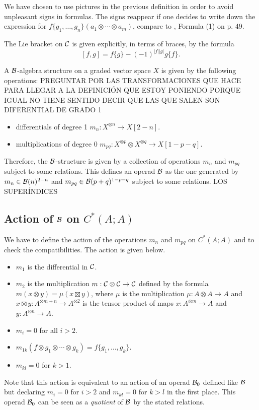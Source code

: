 \documentclass[TFM.tex]{subfiles}
\begin{document}
\begin{remark}
We have chosen to use pictures in the previous definition in order to avoid unpleasant
signs in formulas. The signs reappear if one decides to write down the expression for
$f\{g_1,\dots, g_n\}(a_1\otimes \cdots \otimes a_m)$, compare to \cite{GJHinich}, Formula (1) on p. 49.
\end{remark}

The Lie bracket on $\mathcal{C}$ is given explicitly, in terms of braces, by the formula %
\[
[f,g]=f\{g\}-(-1)^{|f||g|}g\{f\}.
\]


\begin{defi}
A $\mathcal{B}$-algebra structure on a graded vector space $X$ is given by the following operations: PREGUNTAR POR LAS TRANSFORMACIONES QUE HACE PARA LLEGAR A LA DEFINICIÓN QUE ESTOY PONIENDO PORQUE IGUAL NO TIENE SENTIDO DECIR QUE LAS QUE SALEN SON DIFERENTIAL DE GRADO 1
\begin{itemize}
\item differentials of degree 1 $m_n:X^{\otimes n}\to X[2-n]$.
\item multiplications of degree 0 $m_{pq}:X^{\otimes p}\otimes X^{\otimes q}\to X[1-p-q]$.
\end{itemize}
Therefore, the $\mathcal{B}$-structure is given by a collection of operations $m_n$ and $m_{pq}$
subject to some relations. This defines an operad $\mathcal{B}$ as the one generated by $m_n\in\mathcal{B}(n)^{2-n}$ and $m_{pq}\in\mathcal{B}(p+q)^{1-p-q}$ subject to some relations. LOS SUPERÍNDICES
\end{defi}

\subsection{Action of $\mathcal{B}$ on $C^*(A;A)$}
We have to define the action of the operations
$m_n$ and $m_{pq}$ on $C^*(A;A)$ and to check the compatibilities. The action is given below.
\begin{itemize}
\item $m_1$ is the differential in $\mathcal{C}$. 
\item $m_2$ is the multiplication $m:\mathcal{C}\otimes\mathcal{C}\to\mathcal{C}$ defined by the formula $m(x\otimes y)=\mu(x\boxtimes y)$, where $\mu$ is the multiplication $\mu:A\otimes A\to A$ and $x\boxtimes y:A^{\otimes m+n}\to A^{\otimes 2}$ is the tensor product of maps $x:A^{\otimes m}\to A$ and $y:A^{\otimes n}\to A$.
\item $m_i=0$ for all $i>2$.
\item $m_{1k}(f\otimes g_1\otimes\cdots\otimes g_k)=f\{g_1,\dots, g_k\}$.
\item $m_{kl}=0$ for $k>1$.
\end{itemize}
Note that this action is equivalent to an action of an operad $\mathcal{B}_0$ defined like $\mathcal{B}$ but declaring $m_i=0$ for $i>2$ and $m_{kl}=0$ for $k>l$ in the first place. This operad $\mathcal{B}_0$ can be seen as a \emph{quotient} of $\mathcal{B}$ by the stated relations. 
\end{document}
